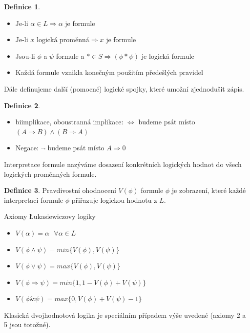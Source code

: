 \documentclass[a4]{report}
\theoremstyle{definition}
\newtheorem{definition}{Definice}[section]
\begin{document}
\begin{definition}
\begin{itemize}
    \item Je-li $\alpha\in L \Rightarrow  \alpha $ je formule
    \item Je-li $x\textrm{ logická proměnná} \Rightarrow x$ je formule
    \item Jsou-li  $\phi$ a $\psi$ formule a $*\in S\Rightarrow (\phi * \psi )$ je logická formule
    \item Každá formule vznikla konečným použitím předešlých pravidel
\end{itemize}

\end{definition}

Dále definujeme další (pomocné) logické spojky, které umožní zjednodušit zápis.

\begin{definition}
\begin{itemize}
\item  biimplikace, oboustranná implikace: $\Leftrightarrow$ budeme psát místo $(A\Rightarrow B) \wedge (B\Rightarrow A) $
\item  Negace: $\neg$ budeme psát místo $A\Rightarrow 0$
\end{itemize}
\end{definition}

Interpretace formule nazýváme dosazení konkrétních logických hodnot do všech logických proměnných formule.

\begin{definition}
Pravdivostní ohodnocení $V(\phi)$ formule $\phi$ je zobrazení, které každé interpretaci formule $\phi$ přiřazuje logickou hodnotu z $L$.
\end{definition}


Axiomy Łukasiewiczovy logiky
\begin{itemize}
\item  $V(\alpha)=\alpha \ \ \ \forall \alpha\in L$
\item  $V(\phi \wedge \psi)=min\{ V(\phi),V(\psi)  \}$
\item  $V(\phi \vee \psi)=max\{ V(\phi),V(\psi)  \}$
\item  $V(\phi \Rightarrow \psi)=min\{1,1- V(\phi)+V(\psi)  \}$
\item  $V(\phi \& \psi)=max\{0,V(\phi)+V(\psi)-1  \}$
\end{itemize}

Klasická dvojhodnotová logika je speciálním případem výše uvedené (axiomy 2 a 5 jsou totožné).
\end{document}
